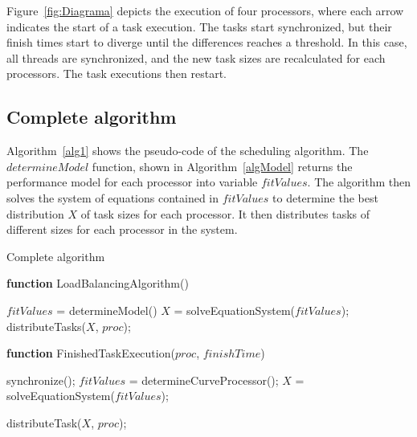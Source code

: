 \documentclass[journal]{IEEEtran}
\begin{document}
Figure~\ref{fig:Diagrama} depicts the execution of four processors, where
each arrow indicates the start of a task execution. The tasks start
synchronized, but their finish times start to diverge until the differences
reaches a threshold. In this case, all threads are synchronized, and the new
task sizes are recalculated for each processors. The task executions then
restart.

\subsection{Complete algorithm}
Algorithm~\ref{alg1} shows the pseudo-code of the scheduling algorithm. The
$determineModel$ function, shown in Algorithm~\ref{algModel} returns the
performance model for each processor into variable $fitValues$. The algorithm
then solves the system of equations contained in $fitValues$ to determine the
best distribution $X$ of task sizes for each processor. It then distributes
tasks of different sizes for each processor in the system.

\begin{algorithm}

\caption{Complete algorithm}
\label{alg1}

\begin{algorithmic}		

\STATE \textbf{function} LoadBalancingAlgorithm()

\STATE $fitValues$ = determineModel()
\STATE $X$ = solveEquationSystem($fitValues$);
  \STATE distributeTasks($X$, $proc$);
\ENDFOR
\end{algorithmic}

\vspace{0.2cm}

\begin{algorithmic}		
\STATE \textbf{function} FinishedTaskExecution($proc$, $finishTime$)


		\STATE synchronize();
		\STATE $fitValues$ = determineCurveProcessor();
        \STATE $X$ = solveEquationSystem($fitValues$);
    \ENDIF
        
	\STATE distributeTask($X$, $proc$);
    
\ENDIF


\end{algorithmic}
\end{algorithm}
\end{document}
